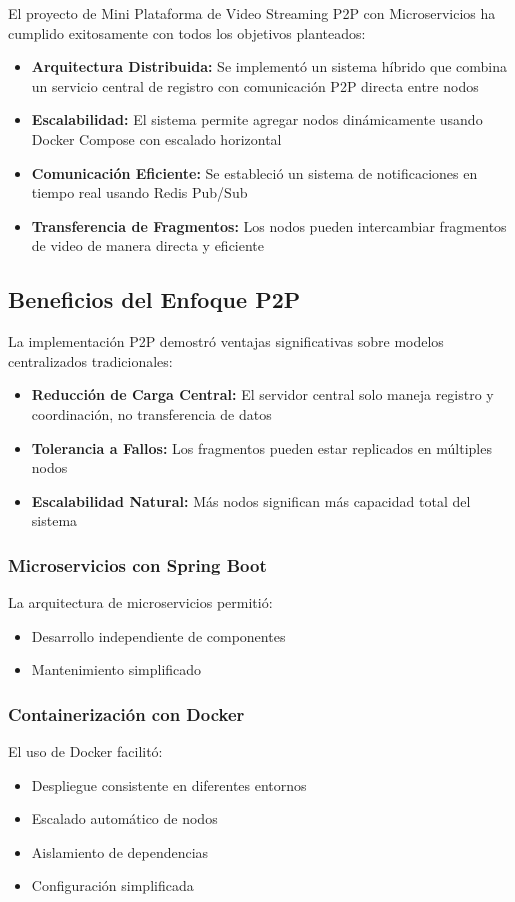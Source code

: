 El proyecto de Mini Plataforma de Video Streaming P2P con Microservicios ha cumplido exitosamente con todos los objetivos planteados:

\begin{itemize}
    \item \textbf{Arquitectura Distribuida:} Se implementó un sistema híbrido que combina un servicio central de registro con comunicación P2P directa entre nodos
    \item \textbf{Escalabilidad:} El sistema permite agregar nodos dinámicamente usando Docker Compose con escalado horizontal
    \item \textbf{Comunicación Eficiente:} Se estableció un sistema de notificaciones en tiempo real usando Redis Pub/Sub
    \item \textbf{Transferencia de Fragmentos:} Los nodos pueden intercambiar fragmentos de video de manera directa y eficiente
\end{itemize}

\subsection*{Beneficios del Enfoque P2P}

La implementación P2P demostró ventajas significativas sobre modelos centralizados tradicionales:

\begin{itemize}
    \item \textbf{Reducción de Carga Central:} El servidor central solo maneja registro y coordinación, no transferencia de datos
    \item \textbf{Tolerancia a Fallos:} Los fragmentos pueden estar replicados en múltiples nodos
    \item \textbf{Escalabilidad Natural:} Más nodos significan más capacidad total del sistema
\end{itemize}


\subsubsection*{Microservicios con Spring Boot}
La arquitectura de microservicios permitió:
\begin{itemize}
    \item Desarrollo independiente de componentes
    \item Mantenimiento simplificado
\end{itemize}

\subsubsection*{Containerización con Docker}
El uso de Docker facilitó:
\begin{itemize}
    \item Despliegue consistente en diferentes entornos
    \item Escalado automático de nodos
    \item Aislamiento de dependencias
    \item Configuración simplificada
\end{itemize}

